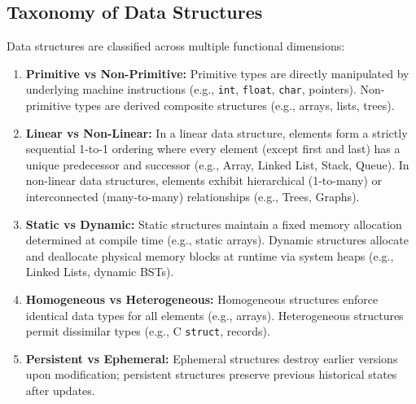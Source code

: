 \documentclass[12pt,a4paper]{article}
\begin{document}
\subsection{Taxonomy of Data Structures}
Data structures are classified across multiple functional dimensions:
\begin{enumerate}[leftmargin=*, itemsep=4pt]
  \item \textbf{Primitive vs Non-Primitive:} Primitive types are directly manipulated by underlying machine instructions (e.g., \texttt{int}, \texttt{float}, \texttt{char}, pointers). Non-primitive types are derived composite structures (e.g., arrays, lists, trees).
  \item \textbf{Linear vs Non-Linear:} In a linear data structure, elements form a strictly sequential 1-to-1 ordering where every element (except first and last) has a unique predecessor and successor (e.g., Array, Linked List, Stack, Queue). In non-linear data structures, elements exhibit hierarchical (1-to-many) or interconnected (many-to-many) relationships (e.g., Trees, Graphs).
  \item \textbf{Static vs Dynamic:} Static structures maintain a fixed memory allocation determined at compile time (e.g., static arrays). Dynamic structures allocate and deallocate physical memory blocks at runtime via system heaps (e.g., Linked Lists, dynamic BSTs).
  \item \textbf{Homogeneous vs Heterogeneous:} Homogeneous structures enforce identical data types for all elements (e.g., arrays). Heterogeneous structures permit dissimilar types (e.g., C \texttt{struct}, records).
  \item \textbf{Persistent vs Ephemeral:} Ephemeral structures destroy earlier versions upon modification; persistent structures preserve previous historical states after updates.
\end{enumerate}
\end{document}
